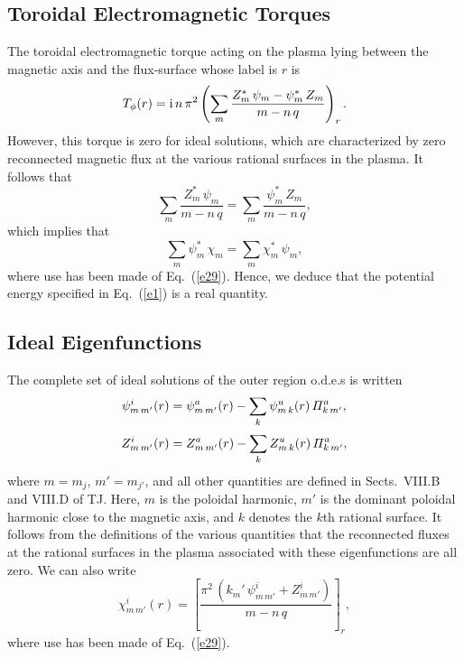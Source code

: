 \documentclass[12pt,prb,aps,notitlepage]{revtex4-1}
\begin{document}
\subsection{Toroidal Electromagnetic Torques}
The toroidal electromagnetic torque acting on the plasma lying between the magnetic axis and the flux-surface whose label is $r$ is
\begin{equation}
T_\phi(r) = {\rm i}\,n\,\pi^2\left(\sum_m\frac{Z_m^\ast\,\psi_m-\psi_m^\ast\,Z_m}{m-n\,q}\right)_{r}.
\end{equation}
However, this torque is zero for ideal solutions, which are characterized by zero reconnected magnetic flux at the various rational surfaces in the plasma.
It follows that
\begin{equation}
\sum_m\frac{Z_m^\ast\,\psi_m}{m-n\,q} = \sum_m\frac{\psi_m^{\ast}\,Z_m}{m-n\,q},
\end{equation}
which implies that
\begin{equation}\label{e36}
\sum_m\psi_m^\ast\,\chi_m= \sum_m \chi_m^\ast\,\psi_m,
\end{equation}
where use has been made of Eq.~(\ref{e29}). 
Hence, we deduce that the potential energy specified in Eq.~(\ref{e1}) is a real quantity. 

\subsection{Ideal Eigenfunctions}
The complete set of ideal solutions of the outer region o.d.e.s is written
\begin{align}
\psi_{m\,m'}^i(r)&= \psi_{m\,m'}^a(r)-\sum_{k}\psi_{m\,k}^u(r)\,{\mit\Pi}_{k\,m'}^a,\\[0.5ex]
Z_{m\,m'}^i(r)&= Z_{m\,m'}^a(r)-\sum_{k}Z_{m\,k}^u(r)\,{\mit\Pi}_{k\,m'}^a,
\end{align}
where $m=m_j$, $m'=m_{j'}$, and all other quantities are defined in Sects.~VIII.B and VIII.D of TJ. 
Here, $m$ is the poloidal harmonic,  $m'$ is the dominant poloidal harmonic close to the magnetic axis, and $k$ denotes the $k$th rational surface. It follows
from the definitions of the various quantities that the reconnected fluxes at the rational surfaces in the plasma
associated with these eigenfunctions are all zero. We can also write
\begin{equation}
\chi^i_{m\,m'}(r) = \left[\frac{\pi^2\,(k_{m}'\,\psi^i_{m\,m'}+Z_{m\,m'}^i)}{m-n\,q}\right]_r,
\end{equation}
where use has been made of Eq.~(\ref{e29}).
\end{document}
